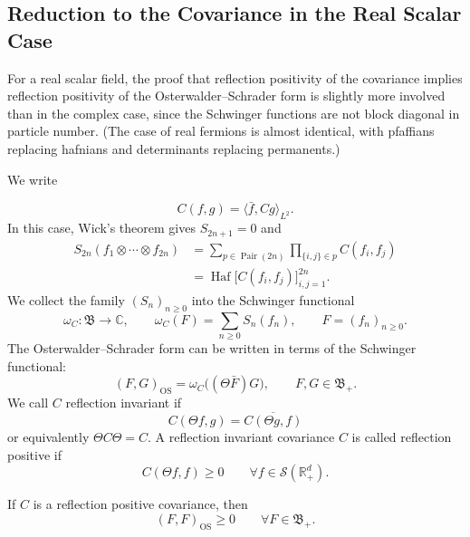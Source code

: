 \documentclass[10pt,a4paper,oneside,reqno]{amsart}
\begin{document}
\begin{appendices}
\section{Reduction to the Covariance in the Real Scalar Case}
For a real scalar field, the proof that reflection positivity of the covariance implies reflection positivity of the Osterwalder--Schrader form is slightly more involved than in the complex case, since the Schwinger functions are not block diagonal in particle number. (The case of real fermions is almost identical, with pfaffians replacing hafnians and determinants replacing permanents.)

We write

\begin{equation}
  C(f,g)=\langle\bar f,Cg\rangle_{L^2}.
\end{equation}
In this case, Wick's theorem gives $S_{2n+1}=0$ and
\begin{equation}
\begin{aligned}
  S_{2n}(f_1\otimes\cdots\otimes f_{2n})
  &=
  \sum_{p\in\operatorname{Pair}(2n)}
  \prod_{\{i,j\}\in p}C(f_i,f_j)\\
  &=
  \operatorname{Haf}
  \bigl[C(f_i,f_j)\bigr]_{i,j=1}^{2n}.
\end{aligned}
\end{equation}
We collect the family $(S_n)_{n\geq0}$ into the Schwinger functional
\begin{equation}
  \omega_C:\mathfrak B\longrightarrow\mathbb C,
  \qquad
  \omega_C(F)
  =
  \sum_{n\geq0}S_n(f_n),
  \qquad
  F=(f_n)_{n\geq0}.
\end{equation}
The Osterwalder--Schrader form can be written in terms of the Schwinger functional:
\begin{equation}
  (F,G)_{\mathrm{OS}}
  =
  \omega_C\bigl((\Theta\bar F)G\bigr),
  \qquad
  F,G\in\mathfrak B_+.
\end{equation}
We call $C$ reflection invariant if 
\begin{equation}
  C(\Theta f, g) = \overline{C(\Theta g, f)}
\end{equation}
or equivalently $\Theta C \Theta = C$. A reflection invariant covariance $C$ is called reflection positive if
\begin{equation}
  C(\Theta f, f) \geq 0
  \qquad
  \forall f\in\mathcal S(\mathbb R_+^d).
\end{equation}
\begin{theorem}\label{thm:reduction-real-case}
If $C$ is a reflection positive covariance, then
\begin{equation}
  (F,F)_{\mathrm{OS}}\geq0
  \qquad
  \forall F\in\mathfrak B_+.
\end{equation}
\end{theorem}


\end{appendices}
\end{document}
